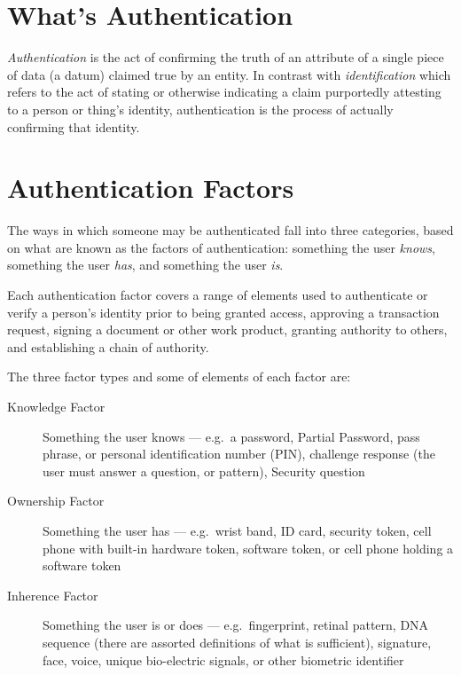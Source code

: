 \documentclass[11pt]{report}
\begin{document}
\section{What's Authentication}

\emph{Authentication} is the act of confirming the truth of an attribute
of a single piece of data (a datum) claimed true by an entity. In
contrast with \emph{identification} which refers to the act of stating
or otherwise indicating a claim purportedly attesting to a person or
thing's identity, authentication is the process of actually confirming
that identity.


\section{Authentication Factors}

The ways in which someone may be authenticated fall into three
categories, based on what are known as the factors of authentication:
something the user \emph{knows}, something the user \emph{has}, and
something the user \emph{is}.

Each authentication factor covers a range of elements used to
authenticate or verify a person's identity prior to being granted
access, approving a transaction request, signing a document or other
work product, granting authority to others, and establishing a chain of
authority.


The three factor types and some of elements of each factor are:

\begin{description}

    \item[Knowledge Factor] Something the user knows --- e.g.\ a 
        password, Partial Password, pass phrase, or personal identification 
        number (PIN), challenge response (the user must answer a question, 
        or pattern), Security question

    \item[Ownership Factor] Something the user has --- e.g.\ wrist band, 
        ID card, security token, cell phone with built-in hardware token, 
        software token, or cell phone holding a software token

    \item[Inherence Factor] Something the user is or does --- e.g.\ 
        fingerprint, retinal pattern, DNA sequence (there are assorted 
        definitions of what is sufficient), signature, face, voice, 
        unique bio-electric signals, or other biometric identifier

\end{description}
\end{document}
